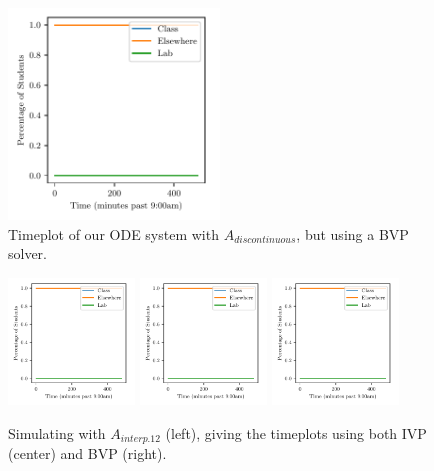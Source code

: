 \documentclass[11pt]{amsart}
\begin{document}
\begin{figure}[htp]
    \centering
    \includegraphics[width=0.5\textwidth]{temp.pdf}
    \caption{Timeplot of our ODE system with $A_{discontinuous}$, but using a BVP solver.}
    \label{fig:discontinuous_alpha_bvp}

\end{figure}



\begin{figure}[htp]
    \centering
    \includegraphics[width=0.3\textwidth]{temp.pdf}\hfill
    \includegraphics[width=0.3\textwidth]{temp.pdf}\hfill
    \includegraphics[width=0.3\textwidth]{temp.pdf}\hfill
    \caption{Simulating with $A_{interp.12}$ (left), giving the timeplots using both IVP (center) and BVP (right).}
    \label{fig:continuous_alpha}

\end{figure}
\end{document}
